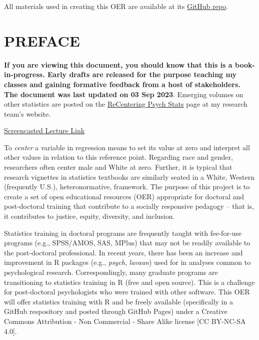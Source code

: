\documentclass[
  11pt,
]{book}
\begin{document}
All materials used in creating this OER are available at its \href{https://github.com/lhbikos/ReC_MultivModel}{GitHub repo}.

\hypertarget{preface}{%
\chapter*{PREFACE}\label{preface}}


\textbf{If you are viewing this document, you should know that this is a book-in-progress. Early drafts are released for the purpose teaching my classes and gaining formative feedback from a host of stakeholders. The document was last updated on 03 Sep 2023}. Emerging volumes on other statistics are posted on the \href{https://lhbikos.github.io/BikosRVT/ReCenter.html}{ReCentering Psych Stats} page at my research team's website.

\href{https://spu.hosted.panopto.com/Panopto/Pages/Viewer.aspx?id=c932455e-ef06-444a-bdca-acf7012d759a}{Screencasted Lecture Link}

To \emph{center} a variable in regression means to set its value at zero and interpret all other values in relation to this reference point. Regarding race and gender, researchers often center male and White at zero. Further, it is typical that research vignettes in statistics textbooks are similarly seated in a White, Western (frequently U.S.), heteronormative, framework. The purpose of this project is to create a set of open educational resources (OER) appropriate for doctoral and post-doctoral training that contribute to a socially responsive pedagogy -- that is, it contributes to justice, equity, diversity, and inclusion.

Statistics training in doctoral programs are frequently taught with fee-for-use programs (e.g., SPSS/AMOS, SAS, MPlus) that may not be readily available to the post-doctoral professional. In recent years, there has been an increase and improvement in R packages (e.g., \emph{psych}, \emph{lavaan}) used for in analyses common to psychological research. Correspondingly, many graduate programs are transitioning to statistics training in R (free and open source). This is a challenge for post-doctoral psychologists who were trained with other software. This OER will offer statistics training with R and be freely available (specifically in a GitHub respository and posted through GitHub Pages) under a Creative Commons Attribution - Non Commercial - Share Alike license {[}CC BY-NC-SA 4.0{]}.
\end{document}
